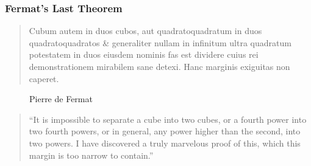 \begin{frame} \frametitle{Fermat's Last Theorem}
\small 

\begin{minipage}{0.33\textwidth}
\tiny
\begin{quote}
Cubum autem in duos cubos, aut quadratoquadratum in duos quadratoquadratos \& generaliter nullam in infinitum ultra quadratum potestatem in duos eiusdem nominis fas est dividere cuius rei demonstrationem mirabilem sane detexi. Hanc marginis exiguitas non caperet. \vspace{0.33cm}
\end{quote} 
\end{minipage}\begin{minipage}{0.33\textwidth}
	\begin{figure}
	\captionsetup{labelformat=empty}
	\centering
	\caption{\hspace{0.1cm}\tiny Pierre de Fermat}
	\end{figure}
\end{minipage}\begin{minipage}{0.33\textwidth} \tiny
\begin{quote}
``It is impossible to separate a cube into two cubes, or a fourth power into two fourth powers, or in general, any power higher than the second, into two powers. I have discovered a truly marvelous proof of this, which this margin is too narrow to contain.'' \vspace{0.9cm}
\end{quote}
\end{minipage}


\end{frame}
